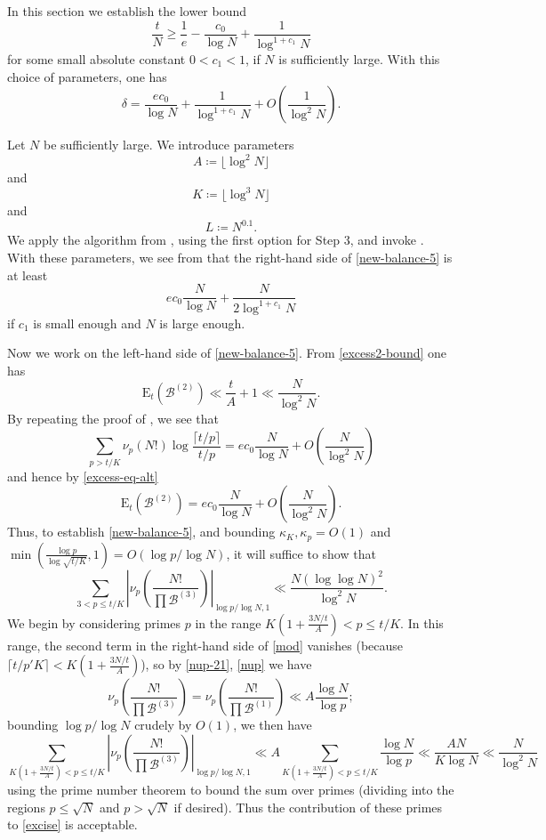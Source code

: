 \documentclass[12pt,a4paper,reqno]{amsart}
\numberwithin{equation}{section}
\theoremstyle{plain}
\theoremstyle{definition}
\newcommand\tuple{{\mathcal B}}
\newcommand\excess{{\mathrm{E}}}
\begin{document}
In this section we establish the lower bound
\begin{equation}\label{main-lower}
   \frac{t}{N} \geq \frac{1}{e} - \frac{c_0}{\log N} + \frac{1}{\log^{1+c_1} N}
\end{equation}
for some small absolute constant $0 < c_1 < 1$, if $N$ is sufficiently large.  With this choice of parameters, one has
$$ \delta = \frac{ec_0}{\log N} + \frac{1}{\log^{1+c_1} N} + O\left( \frac{1}{\log^2 N} \right).$$

Let $N$ be sufficiently large.  We introduce parameters
$$ A \coloneqq \lfloor \log^2 N \rfloor$$
and
$$ K \coloneqq \lfloor \log^3 N \rfloor$$
and
$$ L \coloneqq N^{0.1}.$$
We apply the algorithm from , using the first option for Step 3, and invoke .  With these parameters, we see from  that the right-hand side of \eqref{new-balance-5} is at least
$$ ec_0 \frac{N}{\log N} + \frac{N}{2 \log^{1+c_1} N}$$
if $c_1$ is small enough and $N$ is large enough.  

Now we work on the left-hand side of \eqref{new-balance-5}.  From \eqref{excess2-bound} one has
$$ \excess_t(\tuple^{(2)}) \ll \frac{t}{A} + 1\ll \frac{N}{\log^2 N}.$$
By repeating the proof of , we see that
$$ \sum_{p > t/K} \nu_p(N!) \log \frac{\lceil t/p \rceil}{t/p} = ec_0 \frac{N}{\log N} + O\left( \frac{N}{\log^2 N} \right)$$
and hence by \eqref{excess-eq-alt}
$$ \excess_t(\tuple^{(2)}) = ec_0 \frac{N}{\log N} + O\left( \frac{N}{\log^2 N} \right).$$
Thus, to establish \eqref{new-balance-5}, and bounding $\kappa_K, \kappa_p = O(1)$ and $\min(\frac{\log p}{\log\sqrt{t/K}},1) = O(\log p/\log N)$, it will suffice to show that
\begin{equation}\label{excise}
\sum_{3 < p \leq t/K} \left|\nu_p\left(\frac{N!}{\prod \tuple^{(3)}}\right)\right|_{\log p/\log N,1} \ll \frac{N (\log\log N)^2}{\log^2 N}.
\end{equation}
We begin by considering primes $p$ in the range $K(1+\frac{3N/t}{A}) < p \leq t/K$.  In this range, the second term in the right-hand side of \eqref{mod} vanishes (because $\lceil t/p' K \rceil < K(1+\frac{3N/t}{A})$), so by \eqref{nup-21}, \eqref{nup} we have
\begin{equation}\label{anp}
\nu_p\left(\frac{N!}{\prod \tuple^{(3)}}\right) =
\nu_p\left(\frac{N!}{\prod \tuple^{(1)}}\right)
\ll A \frac{\log N}{\log p};
\end{equation}
bounding $\log p/\log N$ crudely by $O(1)$, we then have
$$
\sum_{K(1+\frac{3N/t}{A}) < p \leq t/K}
\left|\nu_p\left(\frac{N!}{\prod \tuple^{(3)}}\right)\right|_{\log p/\log N,1}
\ll A \sum_{K(1+\frac{3N/t}{A}) < p \leq t/K} \frac{\log N}{\log p} \ll \frac{AN}{K\log N} \ll \frac{N}{\log^2 N}$$
using the prime number theorem to bound the sum over primes (dividing into the regions $p \leq \sqrt{N}$ and $p > \sqrt{N}$ if desired).  Thus the contribution of these primes to \eqref{excise} is acceptable.
\end{document}
